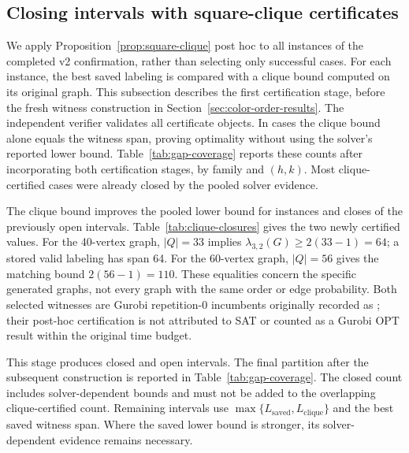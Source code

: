 \subsection{Closing intervals with square-clique certificates}
\label{sec:clique-results}
We apply Proposition~\ref{prop:square-clique} post hoc to all
\CliqueInstances{} instances of the completed v2 confirmation, rather
than selecting only successful cases. For each instance, the best saved
labeling is compared with a clique bound computed on its original graph.
This subsection describes the first certification stage, before the fresh
witness construction in Section~\ref{sec:color-order-results}.
The independent verifier validates all \CliqueInstances{} certificate
objects. In \CliqueIndependentOptima{} cases the clique bound alone
equals the witness span, proving optimality without using the solver's
reported lower bound. Table~\ref{tab:gap-coverage} reports these counts
after incorporating both certification stages, by family and $(h,k)$.
Most clique-certified cases were already closed by the pooled solver evidence.

The clique bound improves the pooled lower bound for \CliqueImproved{}
instances and closes \CliqueNewlyClosed{} of the \ProgressOpen{}
previously open intervals. Table~\ref{tab:clique-closures} gives the two
newly certified values. For the 40-vertex graph, $|Q|=33$ implies
$\lambda_{3,2}(G)\geq2(33-1)=64$; a stored valid labeling has span 64.
For the 60-vertex graph, $|Q|=56$ gives the matching bound
$2(56-1)=110$. These equalities concern the specific generated graphs,
not every graph with the same order or edge probability.
Both selected witnesses are Gurobi repetition-0 incumbents originally
recorded as \FEAS{}; their post-hoc certification is not attributed to SAT
or counted as a Gurobi OPT result within the original time budget.

\begin{table}[htbp]
\centering\small
\caption{Two additional certified $L(3,2)$ optima.}
\label{tab:clique-closures}

\end{table}

This stage produces \EvidenceClosedAfter{} closed and
\EvidenceOpenAfter{} open intervals. The final partition after the
subsequent construction is reported in Table~\ref{tab:gap-coverage}.
The closed count includes solver-dependent
bounds and must not be added to the overlapping clique-certified count.
Remaining intervals use
$\max\{L_{\mathrm{saved}},L_{\mathrm{clique}}\}$ and the best saved witness
span. Where the saved lower bound is stronger, its solver-dependent
evidence remains necessary.

